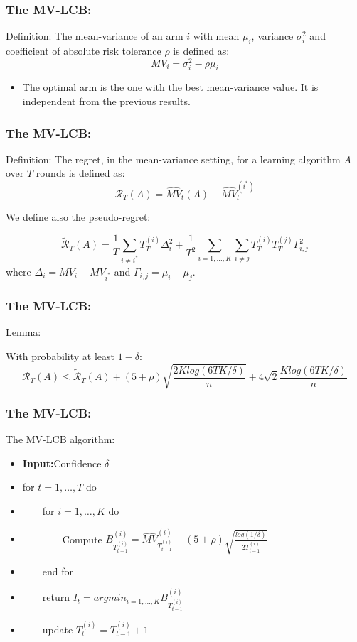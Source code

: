 \documentclass[english]{beamer}
\begin{document}
\begin{frame}
\frametitle{The MV-LCB:}

\begin{block}{Definition:}
The mean-variance of an arm $i$ with mean $\mu_i$, variance $\sigma_i^2$ and coefficient of absolute risk tolerance $\rho$ is defined as: 
$$MV_i=\sigma_i^2-\rho \mu_i$$
\end{block}

\begin{itemize}
\item The optimal arm is the one with the best mean-variance value. It is independent from the previous results.
\end{itemize}
\end{frame}

\begin{frame}
\frametitle{The MV-LCB:}

\begin{block}{Definition:}
The regret, in the mean-variance setting, for a learning algorithm $A$ over $T$ rounds is defined as:
$$
\mathscr{R}_T(A)=\widehat{MV}_t(A)-\widehat{MV}_t^{(i^*)}$$

We define also the pseudo-regret:

$$\tilde{\mathscr{R}}_T(A)=\frac{1}{T}\sum_{i\neq i^*}T_T^{(i)} \Delta_i^2+ \frac{1}{T^2}\sum_{i=1,\dots,K}\sum_{i\neq j}T_T^{(i)}T_T^{(j)}\Gamma_{i,j}^2$$
where $\Delta_i=MV_i-MV_{i^*}$ and $\Gamma_{i,j}=\mu_i-\mu_j$.
\end{block}
\end{frame}

\begin{frame}
\frametitle{The MV-LCB:}

\begin{block}{Lemma:}

With probability at least $1-\delta$:
$$\mathscr{R}_T(A)\leq \tilde{\mathscr{R}}_T(A) + (5+\rho) \sqrt{\frac{2Klog(6TK/\delta)}{n}}+4\sqrt{2}\frac{Klog(6TK/\delta)}{n}$$
\end{block}
\end{frame}

\begin{frame}
\frametitle{The MV-LCB:}
\begin{block}{The MV-LCB algorithm:}
\begin{itemize}
\item[1. \ ] \textbf{Input:}Confidence $\delta$
\item[2. \ ] for $t=1,\dots,T$ do
\item[3. \ ] \ \ \ \ for $i=1,\dots,K$ do
\item[4. \ ] \ \ \ \ \ \ \ \ Compute $B^{(i)}_{T^{(i)}_{t-1}}=\widehat{MV}^{(i)}_{T^{(i)}_{t-1}}-(5+ \rho)\sqrt{\frac{log(1/\delta)}{2T^{(i)}_{t-1}}}$
\item[5. \ ] \ \ \ \ end for
\item[6. \ ] \ \ \ \ return $I_t=arg min_{i=1,\dots,K}B^{(i)}_{T^{(i)}_{t-1}}$
\item[7. \ ] \ \ \ \ update $T^{(i)}_{t}=T^{(i)}_{t-1}+1$
\end{itemize}
\end{block}
\end{frame}
\end{document}

